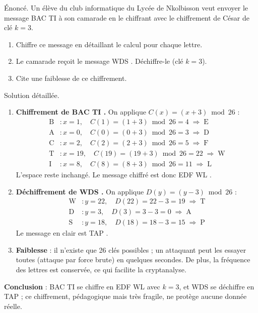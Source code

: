 \documentclass[11pt]{article}
\begin{document}
\begin{exoresolu}[Chiffrement d'un message avec la clé $k = 3$]
Énoncé. Un élève du club informatique du Lycée de Nkolbisson veut envoyer le message \og BAC TI \fg{} à son camarade en le chiffrant avec le chiffrement de César de clé $k = 3$.
\begin{enumerate}
  \item Chiffre ce message en détaillant le calcul pour chaque lettre.
  \item Le camarade reçoit le message \og WDS \fg. Déchiffre-le (clé $k = 3$).
  \item Cite une faiblesse de ce chiffrement.
\end{enumerate}
\tcblower
Solution détaillée.
\begin{enumerate}
  \item \textbf{Chiffrement de \og BAC TI \fg.} On applique $C(x) = (x + 3) \bmod 26$ :
  \begin{align*}
    \text{B} &: x = 1, \quad C(1) = (1+3) \bmod 26 = 4 \;\Rightarrow\; \text{E}\\
    \text{A} &: x = 0, \quad C(0) = (0+3) \bmod 26 = 3 \;\Rightarrow\; \text{D}\\
    \text{C} &: x = 2, \quad C(2) = (2+3) \bmod 26 = 5 \;\Rightarrow\; \text{F}\\
    \text{T} &: x = 19, \quad C(19) = (19+3) \bmod 26 = 22 \;\Rightarrow\; \text{W}\\
    \text{I} &: x = 8, \quad C(8) = (8+3) \bmod 26 = 11 \;\Rightarrow\; \text{L}
  \end{align*}
  L'espace reste inchangé. Le message chiffré est donc \og EDF WL \fg.
  \item \textbf{Déchiffrement de \og WDS \fg.} On applique $D(y) = (y - 3) \bmod 26$ :
  \begin{align*}
    \text{W} &: y = 22, \quad D(22) = 22 - 3 = 19 \;\Rightarrow\; \text{T}\\
    \text{D} &: y = 3, \quad D(3) = 3 - 3 = 0 \;\Rightarrow\; \text{A}\\
    \text{S} &: y = 18, \quad D(18) = 18 - 3 = 15 \;\Rightarrow\; \text{P}
  \end{align*}
  Le message en clair est \og TAP \fg.
  \item \textbf{Faiblesse} : il n'existe que 26 clés possibles ; un attaquant peut les essayer toutes (attaque par force brute) en quelques secondes. De plus, la fréquence des lettres est conservée, ce qui facilite la cryptanalyse.
\end{enumerate}
\textbf{Conclusion} : \og BAC TI \fg{} se chiffre en \og EDF WL \fg{} avec $k = 3$, et \og WDS \fg{} se déchiffre en \og TAP \fg ; ce chiffrement, pédagogique mais très fragile, ne protège aucune donnée réelle.
\end{exoresolu}
\end{document}
